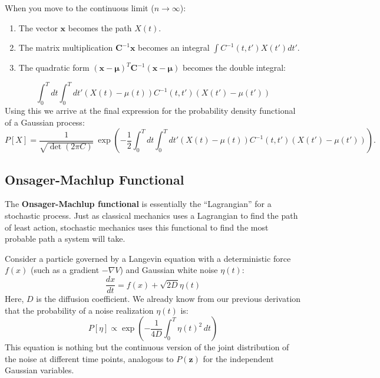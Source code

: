 \documentclass[12pt]{article}
\begin{document}
\begin{singlespace}
When you move to the continuous limit ($n \to \infty$):
\begin{enumerate}
    \item The vector $\mathbf{x}$ becomes the path $X(t)$.
    \item The matrix multiplication $\mathbf{C}^{-1} \mathbf{x}$ becomes an integral $\int C^{-1}(t, t') X(t') dt'$.
    \item The quadratic form $(\mathbf{x}-\boldsymbol{\mu})^T \mathbf{C}^{-1} (\mathbf{x}-\boldsymbol{\mu})$ becomes the double integral:
\end{enumerate}
\begin{equation}
\int_0^T dt \int_0^T dt' (X(t) - \mu(t)) C^{-1}(t, t') (X(t') - \mu(t'))
\end{equation}
Using this we arrive at the final expression for the probability density functional of a Gaussian process:
\begin{equation}P[X] = \frac{1}{\sqrt{\det(2\pi C)}} \ \exp\left( -\frac{1}{2} \int_0^T dt \int_0^T dt' (X(t) - \mu(t)) C^{-1}(t, t') (X(t') - \mu(t')) \right).\end{equation}

\subsection{Onsager-Machlup Functional}

The \textbf{Onsager-Machlup functional} is essentially the ``Lagrangian'' for a stochastic process. Just as classical mechanics uses a Lagrangian to find the path of least action, stochastic mechanics uses this functional to find the most probable path a system will take.

Consider a particle governed by a Langevin equation with a deterministic force $f(x)$ (such as a gradient $-\nabla V$) and Gaussian white noise $\eta(t)$:
\begin{equation}
\frac{dx}{dt} = f(x) + \sqrt{2D} \eta(t)
\end{equation}
Here, $D$ is the diffusion coefficient. We already know from our previous derivation that the probability of a noise realization $\eta(t)$ is:
\begin{equation}
P[\eta] \propto \exp\left( -\frac{1}{4D} \int_0^T \eta(t)^2 \, dt \right)
\end{equation}
This equation is nothing but the continuous version of the joint distribution of the noise at different time points, analogous to $P(\mathbf{z})$ for the independent Gaussian variables.


\end{singlespace}
\end{document}

